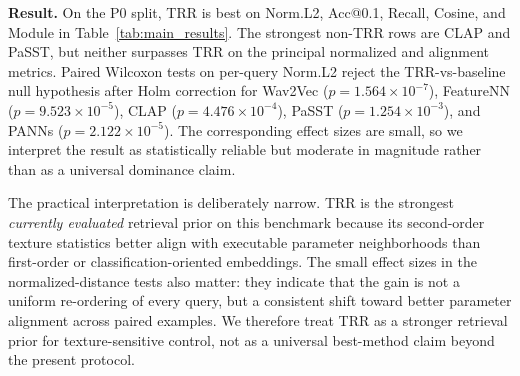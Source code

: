 \begin{table}[t]
\centering
\caption{P0 Protocol-A: direct retrieval comparison on the shared 204-query benchmark. Lower is better for L2 and Norm.L2; higher is better for all other metrics. TRR achieves the best mean performance on the normalized distance and all reported alignment scores.}
\label{tab:main_results}
\small
\setlength{\tabcolsep}{4pt}
\end{table}

\textbf{Result.} On the P0 split, TRR is best on Norm.L2, Acc@0.1, Recall, Cosine, and Module in Table~\ref{tab:main_results}. The strongest non-TRR rows are CLAP and PaSST, but neither surpasses TRR on the principal normalized and alignment metrics. Paired Wilcoxon tests on per-query Norm.L2 reject the TRR-vs-baseline null hypothesis after Holm correction for Wav2Vec ($p=1.564\times10^{-7}$), FeatureNN ($p=9.523\times10^{-5}$), CLAP ($p=4.476\times10^{-4}$), PaSST ($p=1.254\times10^{-3}$), and PANNs ($p=2.122\times10^{-5}$). The corresponding effect sizes are small, so we interpret the result as statistically reliable but moderate in magnitude rather than as a universal dominance claim.

The practical interpretation is deliberately narrow. TRR is the strongest \emph{currently evaluated} retrieval prior on this benchmark because its second-order texture statistics better align with executable parameter neighborhoods than first-order or classification-oriented embeddings. The small effect sizes in the normalized-distance tests also matter: they indicate that the gain is not a uniform re-ordering of every query, but a consistent shift toward better parameter alignment across paired examples. We therefore treat TRR as a stronger retrieval prior for texture-sensitive control, not as a universal best-method claim beyond the present protocol.

